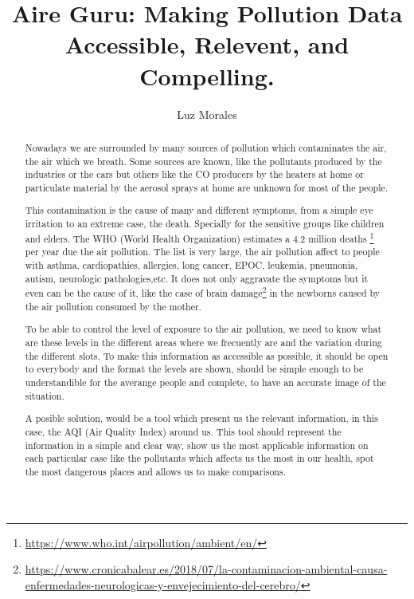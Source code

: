 \documentclass[final,2p,times]{elsarticle}
\begin{document}
\begin{frontmatter}

\title{Aire Guru: Making Pollution Data Accessible, Relevent, and Compelling.}

\author{Luz Morales}
\address{Universidad Internacional de La Rioja}

\begin{abstract}

Nowadays we are surrounded by many sources of pollution which contaminates the air, the air 
which we breath. Some sources are known, like the pollutants produced by
the industries or the cars but others like the CO producers by the heaters at home or 
particulate material by the aerosol sprays at home are unknown for most of the people.

This contamination is the cause of many and different symptoms, from a simple eye irritation 
to an extreme case, the death. Specially for the sensitive groups like children and elders.
The WHO (World Health Organization) estimates a 4.2 million deaths
\footnote{\url{https://www.who.int/airpollution/ambient/en/}} per year due the air pollution.
The list is very large, the air pollution affect to people with asthma, cardiopathies, allergies,
long cancer, EPOC, leukemia, pneumonia, autism, neurologic pathologies,etc.
It does not only aggravate the symptoms but it even can be the cause of it, like the case of brain
damage\footnote{\url{https://www.cronicabalear.es/2018/07/la-contaminacion-ambiental-causa-
enfermedades-neurologicas-y-envejecimiento-del-cerebro/}} 
in the newborns caused by the air pollution consumed by the mother.

To be able to control the level of exposure to the air pollution, we need to know what are these levels
in the different areas where we frecuently are and the variation during the different slots.
To make this information as accessible as possible, it should be open to everybody and the format the levels
are shown, should be simple enough to be understandible for the averange people and complete, to have an 
accurate image of the situation.

A posible solution, would be a tool which present us the relevant information, in this case, the AQI 
(Air Quality Index) around us. This tool should represent the information in a simple and clear way, show us
the most applicable information on each particular case like the pollutants which affects us the most in our
health, spot the most dangerous places and allows us to make comparisons. 


\end{abstract}
\end{frontmatter}
\end{document}
